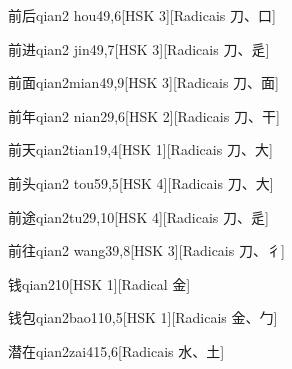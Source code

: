 \begin{entry}{前后}{qian2 hou4}{9,6}[HSK 3][Radicais ⼑、⼝]
\end{entry}

\begin{entry}{前进}{qian2 jin4}{9,7}[HSK 3][Radicais ⼑、⾡]
\end{entry}

\begin{entry}{前面}{qian2mian4}{9,9}[HSK 3][Radicais ⼑、⾯]
\end{entry}

\begin{entry}{前年}{qian2 nian2}{9,6}[HSK 2][Radicais ⼑、⼲]
\end{entry}

\begin{entry}{前天}{qian2tian1}{9,4}[HSK 1][Radicais ⼑、⼤]
\end{entry}

\begin{entry}{前头}{qian2 tou5}{9,5}[HSK 4][Radicais ⼑、⼤]
\end{entry}

\begin{entry}{前途}{qian2tu2}{9,10}[HSK 4][Radicais ⼑、⾡]
\end{entry}

\begin{entry}{前往}{qian2 wang3}{9,8}[HSK 3][Radicais ⼑、⼻]
\end{entry}

\begin{entry}{钱}{qian2}{10}[HSK 1][Radical ⾦]
\end{entry}

\begin{entry}{钱包}{qian2bao1}{10,5}[HSK 1][Radicais ⾦、⼓]
\end{entry}

\begin{entry}{潜在}{qian2zai4}{15,6}[Radicais ⽔、⼟]
\end{entry}

